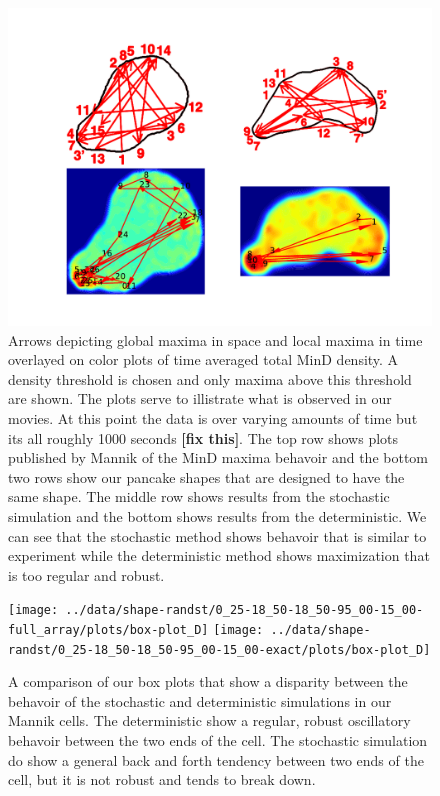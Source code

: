 \documentclass[letterpaper,twocolumn,amsmath,amssymb,pre]{revtex4-1}
\newcommand{\red}[1]{{\bf \color{red} #1}}
\newcommand{\fixme}[1]{\red{[#1]}}
\begin{document}
\begin{figure}
  \centering
  \includegraphics[width=\columnwidth]{../paper/plot-ave}
  \caption{Arrows depicting global maxima in space and local maxima in
    time overlayed on color plots of time averaged total MinD density.
    A density threshold is chosen and only maxima above this threshold
    are shown. The plots serve to illistrate what is observed in our
    movies.  At this point the data is over varying amounts of time
    but its all roughly 1000 seconds\fixme{fix this}.  The top row
    shows plots published by Mannik of the MinD maxima behavoir and
    the bottom two rows show our pancake shapes that are designed to
    have the same shape.  The middle row shows results from the
    stochastic simulation and the bottom shows results from the
    deterministic.  We can see that the stochastic method shows
    behavoir that is similar to experiment while the deterministic
    method shows maximization that is too regular and robust.}
  \label{randst-plot-ave}
\end{figure}

\begin{figure}
  \texttt{[image: ../data/shape-randst/0\_25-18\_50-18\_50-95\_00-15\_00-full\_array/plots/box-plot\_D]}
  \texttt{[image: ../data/shape-randst/0\_25-18\_50-18\_50-95\_00-15\_00-exact/plots/box-plot\_D]}
  \caption{A comparison of our box plots that show a disparity between
    the behavoir of the stochastic and deterministic simulations in
    our Mannik cells.  The deterministic show a regular, robust
    oscillatory behavoir between the two ends of the cell. The
    stochastic simulation do show a general back and forth tendency
    between two ends of the cell, but it is not robust and tends to
    break down.}
  \label{box-mannik}
\end{figure}
\end{document}
